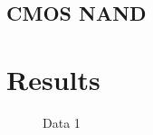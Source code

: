 
\subsection{CMOS NAND}
\label{sec:nand}


\section{Results}
\label{sec:results}

\begin{figure}[hbtp]
  \centering
  
  \caption{\label{fig:data1} Data 1}
\end{figure}

